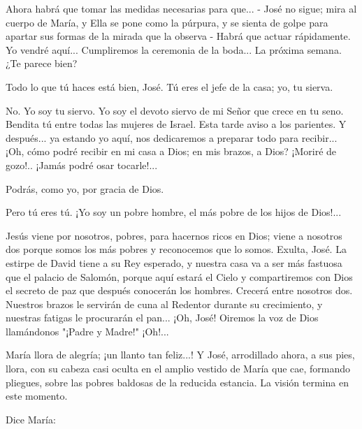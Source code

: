 \documentclass[12pt, twoside, openright]{book} %
\begin{document}
Ahora habrá que tomar las medidas necesarias para que... - José no sigue; mira al cuerpo de María, y Ella se pone como la púrpura, y se sienta de golpe para apartar sus formas de la mirada que la observa - Habrá que actuar rápidamente. Yo vendré aquí... Cumpliremos la ceremonia de la boda... La próxima semana. ¿Te parece bien? 

Todo lo que tú haces está bien, José. Tú eres el jefe de la casa; yo, tu sierva. 

No. Yo soy tu siervo. Yo soy el devoto siervo de mi Señor que crece en tu seno. Bendita tú entre todas las mujeres de Israel. Esta tarde aviso a los parientes. Y después... ya estando yo aquí, nos dedicaremos a preparar todo para recibir... ¡Oh, cómo podré recibir en mi casa a Dios; en mis brazos, a Dios? ¡Moriré de gozo!.. ¡Jamás podré osar tocarle!... 

Podrás, como yo, por gracia de Dios. 

Pero tú eres tú. ¡Yo soy un pobre hombre, el más pobre de los hijos de Dios!... 

Jesús viene por nosotros, pobres, para hacernos ricos en Dios; viene a nosotros dos porque somos los más pobres y reconocemos que lo somos. Exulta, José. La estirpe de David tiene a su Rey esperado, y nuestra casa va a ser más fastuosa que el palacio de Salomón, porque aquí estará el Cielo y compartiremos con Dios el secreto de paz que después conocerán los hombres. Crecerá entre nosotros dos. Nuestros brazos le servirán de cuna al Redentor durante su crecimiento, y nuestras fatigas le procurarán el pan... ¡Oh, José! Oiremos la voz de Dios llamándonos "¡Padre y Madre!" ¡Oh!... 

María llora de alegría; ¡un llanto tan feliz...! Y José, arrodillado ahora, a sus pies, llora, con su cabeza casi oculta en el amplio vestido de María que cae, formando pliegues, sobre las pobres baldosas de la reducida estancia. La visión termina en este momento. 

Dice María: 
\end{document}
